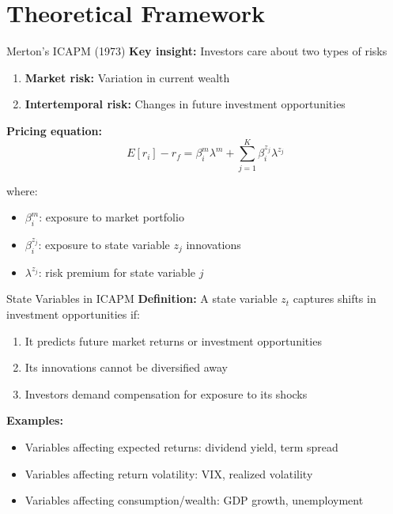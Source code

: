 \documentclass{beamer}
\begin{document}
\section{Theoretical Framework}

\begin{frame}{Merton's ICAPM (1973)}
\textbf{Key insight:} Investors care about two types of risks
\begin{enumerate}
\item \textbf{Market risk:} Variation in current wealth
\item \textbf{Intertemporal risk:} Changes in future investment opportunities
\end{enumerate}

\vspace{0.5cm}
\textbf{Pricing equation:}
$$E[r_i] - r_f = \beta_i^m \lambda^m + \sum_{j=1}^{K} \beta_i^{z_j} \lambda^{z_j}$$

where:
\begin{itemize}
\item $\beta_i^m$: exposure to market portfolio
\item $\beta_i^{z_j}$: exposure to state variable $z_j$ innovations
\item $\lambda^{z_j}$: risk premium for state variable $j$
\end{itemize}
\end{frame}

\begin{frame}{State Variables in ICAPM}
\textbf{Definition:} A state variable $z_t$ captures shifts in investment opportunities if:
\begin{enumerate}
\item It predicts future market returns or investment opportunities
\item Its innovations cannot be diversified away
\item Investors demand compensation for exposure to its shocks
\end{enumerate}

\vspace{0.5cm}
\textbf{Examples:}
\begin{itemize}
\item Variables affecting expected returns: dividend yield, term spread
\item Variables affecting return volatility: VIX, realized volatility
\item Variables affecting consumption/wealth: GDP growth, unemployment
\end{itemize}
\end{frame}
\end{document}
